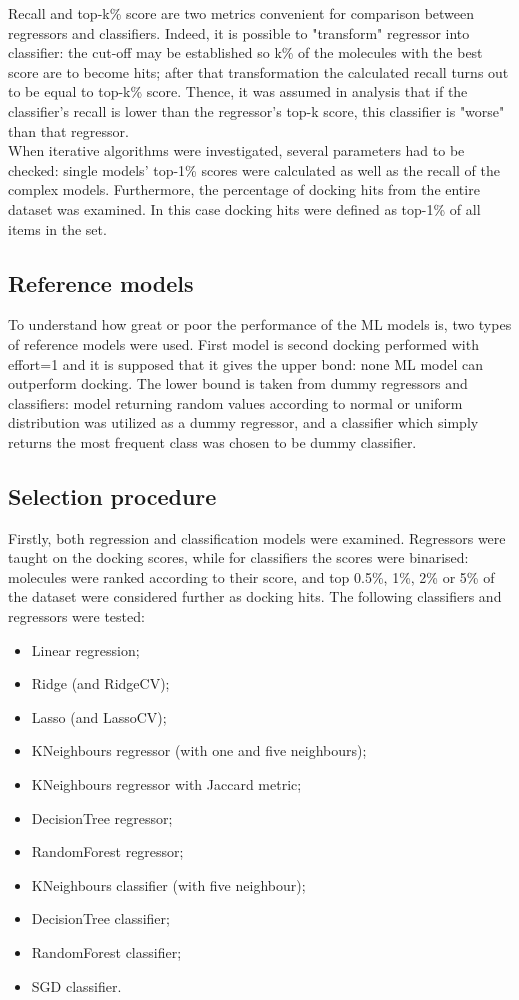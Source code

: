 Recall and top-k\% score are two metrics convenient for comparison between regressors and classifiers.
Indeed, it is possible to "transform" regressor into classifier: the cut-off may be established so k\% of the molecules with the best score are to become hits; after that transformation the calculated recall turns out to be equal to top-k\% score.
Thence, it was assumed in analysis that if the classifier's recall is lower than the regressor's top-k score, this classifier is "worse" than that regressor.\\

When iterative algorithms were investigated, several parameters had to be checked: single models' top-1\% scores were calculated as well as the recall of the complex models.
Furthermore, the percentage of docking hits from the entire dataset was examined.
In this case docking hits were defined as top-1\% of all items in the set.\\

\subsection{Reference models}
To understand how great or poor the performance of the ML models is, two types of reference models were used.
First model is second docking performed with effort=1 and it is supposed that it gives the upper bond: none ML model can outperform docking.
The lower bound is taken from dummy regressors and classifiers: model returning random values according to normal or uniform distribution was utilized as a dummy regressor, and a classifier which simply returns the most frequent class was chosen to be dummy classifier.\\

\subsection{Selection procedure}
Firstly, both regression and classification models were examined.
Regressors were taught on the docking scores, while for classifiers the scores were binarised: molecules were ranked according to their score, and top 0.5\%, 1\%, 2\% or 5\% of the dataset were considered further as docking hits.
The following classifiers and regressors were tested:
\begin{itemize}
    \item Linear regression;
    \item Ridge (and RidgeCV);
    \item Lasso (and LassoCV);
    \item KNeighbours regressor (with one and five neighbours);
    \item KNeighbours regressor with Jaccard metric;
    \item DecisionTree regressor;
    \item RandomForest regressor;
    \item KNeighbours classifier (with five neighbour);
    \item DecisionTree classifier;
    \item RandomForest classifier;
    \item SGD classifier.
\end{itemize}

